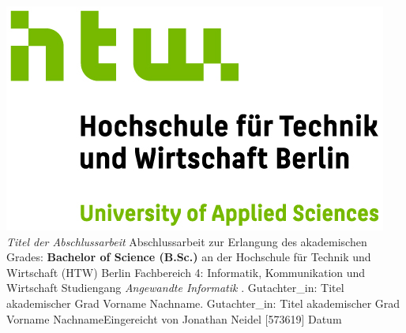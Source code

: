 \documentclass[oneside,bibliography=totocnumbered,BCOR=5mm]{scrbook}
\begin{document}
\begin{titlepage}
\begin{center}
\includegraphics{htw-logo.jpg}
\linebreak[4]
\linebreak[4]
\linebreak[4]
\linebreak[4]
\textit{\large Titel der Abschlussarbeit}
\linebreak[4]
\linebreak[4]
\linebreak[4]
Abschlussarbeit
\linebreak[4]
\linebreak[4]
zur Erlangung des akademischen Grades:
\linebreak[4]
\linebreak[4]
\textbf{Bachelor of Science (B.Sc.)}
\linebreak[4]
\linebreak[4]
an der
\linebreak[4]
\linebreak[4]
Hochschule f\"ur Technik und Wirtschaft (HTW) Berlin
\linebreak[4]
Fachbereich 4: Informatik, Kommunikation und Wirtschaft
\linebreak[4]
Studiengang \textit{Angewandte Informatik}
\linebreak[4]
\linebreak[4]
. Gutachter\_in: Titel akademischer Grad Vorname Nachname. Gutachter\_in: Titel akademischer Grad Vorname Nachname\linebreak[4]
\linebreak[4]
\linebreak[4]
\linebreak[4]
\linebreak[4]
Eingereicht von Jonathan Neidel [573619]
\linebreak[4]
\linebreak[4]
\linebreak[4]
\linebreak[4]
Datum

\end{center}
\end{titlepage}
\newpage    %
\end{document}
